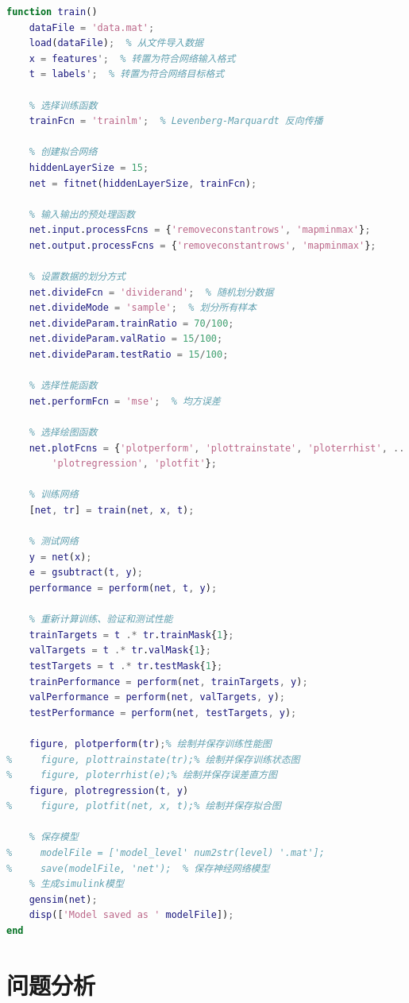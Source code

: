 \documentclass[12pt,a4paper,UTF8]{article}
\begin{document}
\begin{lstlisting}[language=Matlab,caption=使用脚本替代ui操作，并且函数化]
function train()
    dataFile = 'data.mat';
    load(dataFile);  % 从文件导入数据
    x = features';  % 转置为符合网络输入格式
    t = labels';  % 转置为符合网络目标格式

    % 选择训练函数
    trainFcn = 'trainlm';  % Levenberg-Marquardt 反向传播

    % 创建拟合网络
    hiddenLayerSize = 15;
    net = fitnet(hiddenLayerSize, trainFcn);

    % 输入输出的预处理函数
    net.input.processFcns = {'removeconstantrows', 'mapminmax'};
    net.output.processFcns = {'removeconstantrows', 'mapminmax'};

    % 设置数据的划分方式
    net.divideFcn = 'dividerand';  % 随机划分数据
    net.divideMode = 'sample';  % 划分所有样本
    net.divideParam.trainRatio = 70/100;
    net.divideParam.valRatio = 15/100;
    net.divideParam.testRatio = 15/100;

    % 选择性能函数
    net.performFcn = 'mse';  % 均方误差

    % 选择绘图函数
    net.plotFcns = {'plotperform', 'plottrainstate', 'ploterrhist', ...
        'plotregression', 'plotfit'};

    % 训练网络
    [net, tr] = train(net, x, t);

    % 测试网络
    y = net(x);
    e = gsubtract(t, y);
    performance = perform(net, t, y);

    % 重新计算训练、验证和测试性能
    trainTargets = t .* tr.trainMask{1};
    valTargets = t .* tr.valMask{1};
    testTargets = t .* tr.testMask{1};
    trainPerformance = perform(net, trainTargets, y);
    valPerformance = perform(net, valTargets, y);
    testPerformance = perform(net, testTargets, y);

    figure, plotperform(tr);% 绘制并保存训练性能图
%     figure, plottrainstate(tr);% 绘制并保存训练状态图
%     figure, ploterrhist(e);% 绘制并保存误差直方图
    figure, plotregression(t, y)
%     figure, plotfit(net, x, t);% 绘制并保存拟合图

    % 保存模型
%     modelFile = ['model_level' num2str(level) '.mat'];
%     save(modelFile, 'net');  % 保存神经网络模型
    % 生成simulink模型
    gensim(net);
    disp(['Model saved as ' modelFile]);
end
\end{lstlisting}


\section{问题分析}
\end{document}

